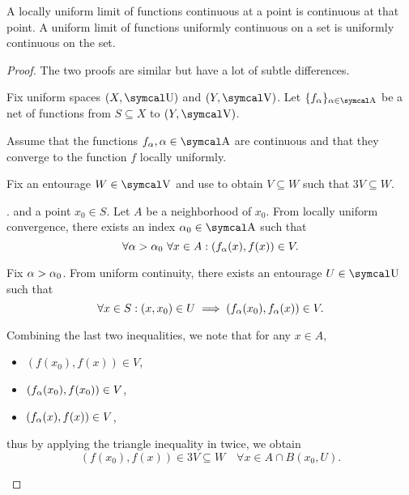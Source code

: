 \begin{proposition}\label{def:uniform_limit_of_continuous_functions}
  \mbox{}
  \begin{propenum}
     A locally uniform limit of functions continuous at a point is continuous at that point.
     A uniform limit of functions uniformly continuous on a set is uniformly continuous on the set.
  \end{propenum}
\end{proposition}
\begin{proof}\mbox{}
  The two proofs are similar but have a lot of subtle differences.

  Fix uniform spaces \( (X, \CU) \) and \( (Y, \CV) \). Let \( \{ f_\al \}_{\al \in \CA} \) be a net of functions from \( S \subseteq X \) to \( (Y, \CV) \).

  \begin{description}
     Assume that the functions \( f_\al, \al \in \CA \) are continuous and that they converge to the function \( f \) locally uniformly.

    Fix an entourage \( W \in \CV \) and use  to obtain \( V \subseteq W \) such that \( 3V \subseteq W \).

    . and a point \( x_0 \in S \). Let \( A \) be a neighborhood of \( x_0 \). From locally uniform convergence, there exists an index \( \al_0 \in \CA \) such that
    \begin{equation*}
      \forall \alpha > \alpha_0 \ \forall x \in A : (f_\alpha(x), f(x)) \in V.
    \end{equation*}

    Fix \( \alpha > \alpha_0 \). From uniform continuity, there exists an entourage \( U \in \CU \) such that
    \begin{equation*}
      \forall x \in S : (x, x_0) \in U \implies (f_\alpha(x_0), f_\alpha(x)) \in V.
    \end{equation*}

    Combining the last two inequalities, we note that for any \( x \in A \),
    \begin{itemize}
      \item \( (f(x_0), f(x)) \in V \),
      \item \( (f_\alpha(x_0), f(x_0)) \in V \),
      \item \( (f_\alpha(x), f(x)) \in V \),
    \end{itemize}
    thus by applying the triangle inequality in  twice, we obtain
    \begin{equation*}
      (f(x_0), f(x)) \in 3V \subseteq W \quad\forall x \in A \cap B(x_0, U).
    \end{equation*}


\end{description}
\end{proof}
